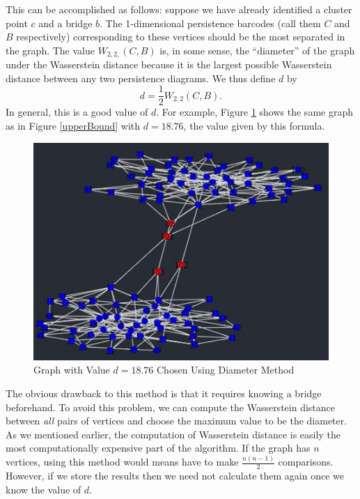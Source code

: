 \documentclass[12pt,a4paper]{amsart}
\numberwithin{equation}{section}
\theoremstyle{plain}
\theoremstyle{definition}
\begin{document}
This can be accomplished as follows: suppose we have already identified a cluster point $c$ and a bridge $b$. The 1-dimensional persistence barcodes (call them $C$ and $B$ respectively) corresponding to these vertices should be the most separated in the graph. The value $W_{2,2,}(C,B)$ is, in some sense, the ``diameter'' of the graph under the Wasserstein distance because it is the largest possible Wasserstein distance between any two persistence diagrams. We thus define $d$ by
\[ d = \frac{1}{2} W_{2,2}(C,B). \]
In general, this is a good value of $d$. For example, Figure \ref{ideald} shows the same graph as in Figure \ref{upperBound} with $d=18.76$, the value given by this formula.

\begin{figure}[h]
	\centering
	\includegraphics[scale=0.8]{IdealBridges.jpg}
	\caption{Graph with Value $d=18.76$ Chosen Using Diameter Method}
	\label{ideald}
\end{figure}
	
\newpage
	
The obvious drawback to this method is that it requires knowing a bridge beforehand. To avoid this problem, we can compute the Wasserstein distance between \textit{all} pairs of vertices and choose the maximum value to be the diameter. As we mentioned earlier, the computation of Wasserstein distance is easily the most computationally expensive part of the algorithm. If the graph has $n$ vertices, using this method would means have to make $\frac{n(n-1)}{2}$ comparisons. However, if we store the results then we need not calculate them again once we know the value of $d$.
\end{document}
